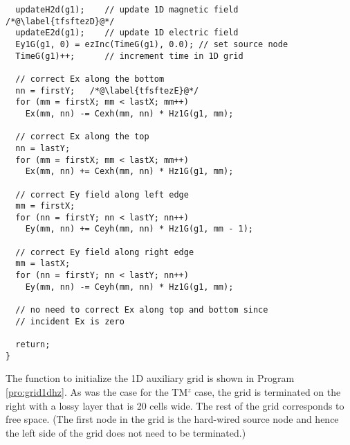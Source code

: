 \begin{program}
\begin{lstlisting}
  updateH2d(g1);    // update 1D magnetic field   /*@\label{tfsftezD}@*/
  updateE2d(g1);    // update 1D electric field
  Ey1G(g1, 0) = ezInc(TimeG(g1), 0.0); // set source node
  TimeG(g1)++;      // increment time in 1D grid

  // correct Ex along the bottom
  nn = firstY;   /*@\label{tfsftezE}@*/
  for (mm = firstX; mm < lastX; mm++)
    Ex(mm, nn) -= Cexh(mm, nn) * Hz1G(g1, mm);

  // correct Ex along the top
  nn = lastY;
  for (mm = firstX; mm < lastX; mm++)
    Ex(mm, nn) += Cexh(mm, nn) * Hz1G(g1, mm);

  // correct Ey field along left edge
  mm = firstX;
  for (nn = firstY; nn < lastY; nn++)
    Ey(mm, nn) += Ceyh(mm, nn) * Hz1G(g1, mm - 1);
  
  // correct Ey field along right edge
  mm = lastX;
  for (nn = firstY; nn < lastY; nn++)
    Ey(mm, nn) -= Ceyh(mm, nn) * Hz1G(g1, mm);
  
  // no need to correct Ex along top and bottom since
  // incident Ex is zero

  return;
}
\end{lstlisting}
\end{program}

The function to initialize the 1D auxiliary grid is shown in Program
\ref{pro:grid1dhz}.  As was the case for the TM$^z$ case, the grid is
terminated on the right with a lossy layer that is 20 cells wide.  The
rest of the grid corresponds to free space.  (The first node in the
grid is the hard-wired source node and hence the left side of the grid
does not need to be terminated.)

